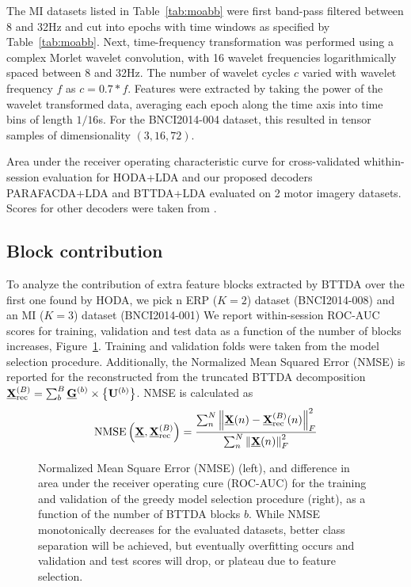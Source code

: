 \documentclass[twocolumn]{article}
\begin{document}
The MI datasets listed in Table~\ref{tab:moabb} were first band-pass filtered
between 8 and 32Hz and cut into
epochs with time windows as specified by Table~\ref{tab:moabb}.
Next, time-frequency transformation was performed using a complex Morlet wavelet
convolution, with 16 wavelet frequencies logarithmically spaced between 8 and
32Hz.
The number of wavelet cycles $c$ varied with wavelet frequency $f$ as
$c=0.7*f$.
Features were extracted by taking the power of the wavelet transformed data,
averaging each epoch along the time axis into time bins of
length $1/16$s.
For the BNCI2014-004 dataset, this resulted in tensor samples of dimensionality
$(3,16,72)$.

\begin{table}[t]
	\footnotesize
	
	\caption{Area under the receiver operating characteristic curve for
		cross-validated whithin-session evaluation for HODA+LDA and our proposed decoders
		PARAFACDA+LDA and BTTDA+LDA evaluated on 2 motor imagery datasets.
		Scores for other decoders were taken from \cite{Chevallier2024}.}
	\label{tab:mi-score}
\end{table}

\subsection{Block contribution}
To analyze the contribution of extra feature blocks extracted by {BTTDA} over
the first one found by \textsc{HODA}, we pick n ERP ($K=2$) dataset
(BNCI2014-008) and an MI ($K=3$) dataset (BNCI2014-001)
We report within-session ROC-AUC scores for training, validation and test data as a function
of the number of blocks increases, Figure~\ref{fig:blocks}.
Training and validation folds were taken from the model selection procedure.
Additionally, the Normalized Mean Squared Error (NMSE) is reported for the
reconstructed from the truncated \textsc{BTTDA} decomposition
$\textstyle{\underline{\mathbf{X}}_\text{rec}^{(B)}=\sum_b^B\underline{\mathbf{G}}^{(b)}\times\left\{\mathbf{U}^{(b)}\right\}}$.
NMSE is calculated as
\begin{equation}
	\operatorname{NMSE}\left(\underline{\mathbf{X}}, \underline{\mathbf{X}}_\text{rec}^{(B)}\right) =
	\frac{\sum_n^N\left\lVert\underline{\mathbf{X}}(n)-\underline{\mathbf{X}}_\text{rec}^{(B)}(n)\right\rVert_F^2}
	{\sum_n^N\left\lVert\underline{\mathbf{X}}(n)\right\rVert_F^2}
\end{equation}
\begin{figure}[t]
	
	\caption{Normalized Mean Square Error (NMSE) (left), and difference in area
		under the receiver operating cure (ROC-AUC) for the training and validation
		of the greedy model selection procedure (right), as a function of the number of BTTDA blocks $b$.
		While NMSE monotonically decreases for the evaluated datasets, better class
		separation will be achieved, but eventually overfitting occurs and validation
		and test scores will drop, or plateau due to feature selection.
	}
	\label{fig:blocks}
\end{figure}
\end{document}
